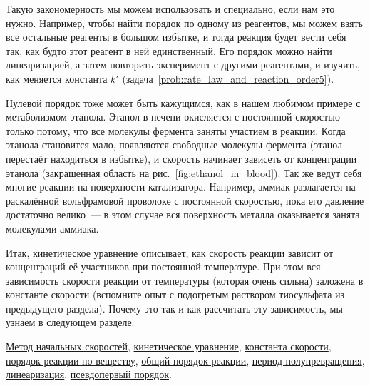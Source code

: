 Такую закономерность мы можем использовать и специально, если нам это нужно. Например, чтобы найти порядок по одному из реагентов, мы можем взять все остальные реагенты в большом избытке, и тогда реакция будет вести себя так, как будто этот реагент в ней единственный. Его порядок можно найти линеаризацией, а затем повторить эксперимент с другими реагентами, и изучить, как меняется константа $k'$ (задача~\ref{prob:rate_law_and_reaction_order5}).

Нулевой порядок тоже может быть кажущимся, как в нашем любимом примере с метаболизмом этанола. Этанол в печени окисляется с постоянной скоростью только потому, что все молекулы фермента заняты участием в реакции. Когда этанола становится мало, появляются свободные молекулы фермента (этанол перестаёт находиться в избытке), и скорость начинает зависеть от концентрации этанола (закрашенная область на рис.~\ref{fig:ethanol_in_blood}). Так же ведут себя многие реакции на поверхности катализатора. Например, аммиак разлагается на раскалённой вольфрамовой проволоке с постоянной скоростью, пока его давление достаточно велико~--- в этом случае вся поверхность металла оказывается занята молекулами аммиака.

Итак, кинетическое уравнение описывает, как скорость реакции зависит от концентраций её участников при постоянной температуре. При этом вся зависимость скорости реакции от температуры (которая очень сильна) заложена в константе скорости (вспомните опыт с подогретым раствором тиосульфата из предыдущего раздела). Почему это так и как рассчитать эту зависимость, мы узнаем в следующем разделе.

\begin{termlist}
    \hyperref[term:method_of_initial_rates]{Метод начальных скоростей},
    \hyperref[term:rate_law]{кинетическое уравнение},
    \hyperref[term:rate_constant]{константа скорости},
    \hyperref[term:reaction_order]{порядок реакции по веществу},
    \hyperref[term:overall_reaction_order]{общий порядок реакции},
    \hyperref[term:reaction_half-life]{период полупревращения},
    \hyperref[term:linearization]{линеаризация},
    \hyperref[term:pseudo-first_order]{псевдопервый порядок}.
\end{termlist}

